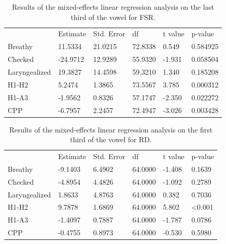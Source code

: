 \documentclass[12pt, letterpaper]{article}
\providecommand{\lsptoprule}{\midrule\toprule}
\providecommand{\lspbottomrule}{\bottomrule\midrule}
\begin{document}
\begin{table}[!h]
	\centering
	\caption{Results of the mixed-effects linear regression analysis on the last third of the vowel for FSR. }
	\label{tab:Third}
	 \begin{tabular}{llllll}
	  \lsptoprule
						&  Estimate  & Std. Error & df & t value & p-value \\
	  	Breathy   		& 11.5334	&	21.0215	&	72.8338	&	0.549	&	0.584925    \\
		Checked    		& -24.9712	&	12.9289	&	55.9320	&	-1.931	&	0.058504  \\
		Laryngealized	& 19.3827	&	14.4598	&	59.3210	&	1.340	&	0.185208 \\
		H1-H2			& 5.2474	&	1.3865	&	73.5567	&	3.785	&	0.000312 \\
		H1-A3			& -1.9562	&	0.8326	&	57.1747	&	-2.350	&	0.022272 \\
		CPP				& -6.7957	&	2.2457	&	72.4947	&	-3.026	&	0.003428 \\
	  \lspbottomrule
	 \end{tabular}
\end{table}


\begin{table}[!h]
	\centering
	\caption{Results of the mixed-effects linear regression analysis on the first third of the vowel for RD. }
	\label{tab:RDFirst}
	 \begin{tabular}{llllll}
	  \lsptoprule
						&  Estimate  & Std. Error & df & t value & p-value \\
	  	Breathy   		&  -9.1403 &    6.4902 & 64.0000 & -1.408  & 0.1639\\    
		Checked        &-4.8954   &  4.4826  &64.0000 & -1.092  & 0.2789    \\
		Laryngealized   &1.8633   &  4.8763  &64.0000  & 0.382 &  0.7036    \\
		H1-H2          &9.7878    & 1.6869  &64.0000  & 5.802 & <0.001\\
		H1-A3         &-1.4097    & 0.7887 & 64.0000 & -1.787 &  0.0786 \\
		CPP              &  -0.4755  &   0.8973 & 64.0000 & -0.530  & 0.5980 \\  
	  \lspbottomrule
	 \end{tabular}
\end{table}
\end{document}
